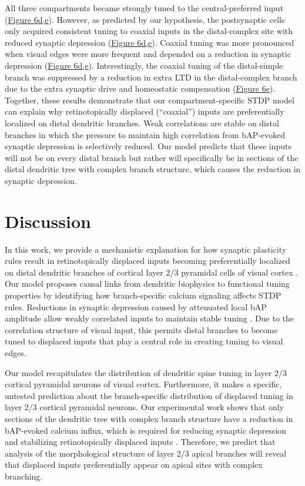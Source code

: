 All three compartments became strongly tuned to the central-preferred input (\hyperref[fig:6]{Figure 6d,e}). However, as predicted by our hypothesis, the postsynaptic cells only acquired consistent tuning to coaxial inputs in the distal-complex site with reduced synaptic depression (\hyperref[fig:6]{Figure 6d,e}). Coaxial tuning was more pronounced when visual edges were more frequent and depended on a reduction in synaptic depression (\hyperref[fig:6]{Figure 6d,e}). Interestingly, the coaxial tuning of the distal-simple branch was suppressed by a reduction in extra LTD in the distal-complex branch due to the extra synaptic drive and homeostatic compensation (\hyperref[fig:6]{Figure 6e}). Together, these results demonstrate that our compartment-specific STDP model can explain why retinotopically displaced (“coaxial”) inputs are preferentially localized on distal dendritic branches. Weak correlations are stable on distal branches in which the pressure to maintain high correlation from bAP-evoked synaptic depression is selectively reduced. Our model predicts that these inputs will not be on every distal branch but rather will specifically be in sections of the distal dendritic tree with complex branch structure, which causes the reduction in synaptic depression.

\section*{Discussion}\label{s:discussion}

In this work, we provide a mechanistic explanation for how synaptic plasticity rules result in retinotopically displaced inputs becoming preferentially localized on distal dendritic branches of cortical layer 2/3 pyramidal cells of visual cortex \citep{iacarusoSynapticOrganizationVisual2017}. Our model proposes causal links from dendritic biophysics to functional tuning properties by identifying how branch-specific calcium signaling affects STDP rules. Reductions in synaptic depression caused by attenuated local bAP amplitude allow weakly correlated inputs to maintain stable tuning \citep{landauDendriticBranchStructure2022}. Due to the correlation structure of visual input, this permits distal branches to become tuned to displaced inputs that play a central role in creating tuning to visual edges. 

Our model recapitulates the distribution of dendritic spine tuning in layer 2/3 cortical pyramidal neurons of visual cortex. Furthermore, it makes a specific, untested prediction about the branch-specific distribution of displaced tuning in layer 2/3 cortical pyramidal neurons. Our experimental work shows that only sections of the dendritic tree with complex branch structure have a reduction in bAP-evoked calcium influx, which is required for reducing synaptic depression and stabilizing retinotopically displaced inputs \citep{landauDendriticBranchStructure2022}. Therefore, we predict that analysis of the morphological structure of layer 2/3 apical branches will reveal that displaced inputs preferentially appear on apical sites with complex branching. 


